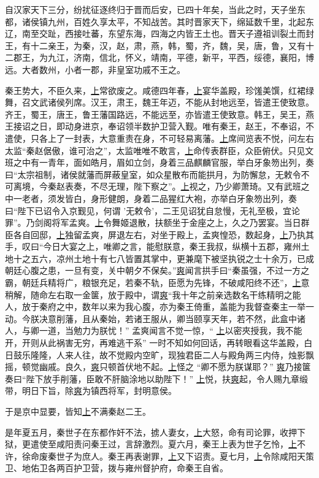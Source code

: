 \documentclass[UTF8]{ctexart}
\begin{document}
自汉家天下三分，纷扰征逐终归于晋而后安，已四十年矣，当此之时，天子坐东都，诸侯镇九州，百姓久享太平，不知战苦。其时晋家天下，绵延数千里，北起东辽，南至交趾，西接吐蕃，东望东海，四海之内皆王土也。晋天子遵祖训裂土而封王，有十二亲王，为秦，汉，赵，肃，燕，韩，蜀，齐，魏，吴，唐，鲁，又有十二郡王，为九江，济南，信北，怀义，靖南，平德，新平，平西，绥德，襄阳，博远。大者数州，小者一郡，非皇室功戚不王之。


秦王势大，不臣久来，\uline{上}常欲废之。咸德四年春，\uline{上}宴华盖殿，珍馐美馔，红裙绿舞，召文武诸侯列席。汉王，肃王，魏王年迈，不能从封地远至，皆遣王使致意。齐王，蜀王，唐王，鲁王藩国路远，不能远至，亦皆遣王使致意。韩王，吴王，燕王接诏之日，即动身进京，奉诏领半数护卫营入觐。唯有秦王，赵王，不奉诏，不遣使，只各上了一封表，大意重责在身，不可轻易离藩。\uline{上}席间览表不悦，问左右太监“秦赵倨傲，谁可治之”，太监唯唯不敢言，\uline{上}命传表群臣，众臣俯伏。只见文班之中有一青年，面如皓月，眉如立剑，身着三品麒麟官服，举白牙象笏出列，奏曰“太宗祖制，诸侯就藩而屏蔽皇室，如众星散布而能拱月，为防懈怠，无敕令不可离境，今秦赵表奏，不尽无理，陛下察之”。\uline{上}视之，乃少卿萧琦。又有武班之中一老者，须发皆白，身形健朗，身着二品猩红大袍，亦举白牙象笏出列，奏曰“陛下已诏令入京觐见，何谓 ’无敕令’，二王见诏犹自怠慢，无礼至极，宜论罪”。乃剑阁将军孟爽。\uline{上}令舞姬退散，扶额坐于金座之上，久之乃罢宴。当日群臣各自回邸，\uline{上}独留孟爽，屏退左右，对坐于殿上，孟爽惶恐，数起身，\uline{上}乃执其手，叹曰“今日大宴之上，唯卿之言，能慰朕意，秦王我叔，纵横十五郡，雍州土地十之五六，凉州土地十有七八皆置其掌中，更兼麾下被坚执锐之士十余万，已成朝廷心腹之患，一旦有变，关中朝夕不保矣。”\uline{爽}闻言拱手曰“秦虽强，不过一方之霸，朝廷兵精将广，粮银充足，若秦不轨，臣愿为先锋，不破咸阳终不还”，\uline{上}意稍解，随命左右取一金箧，放于殿中，谓\uline{爽}“我十年之前亲选数名干练精明之能人，放于秦府之中，数年以来为我心腹，亦为秦王倚重，盖能为我督查秦主一举一动。今朕决意削藩，且从秦始，若诸王服从，卿当颐享天年，若不然，此盒中诸人，与卿一道，当勉力为朕忧！” 孟爽闻言不觉一惊，“ \uline{上}以密夾授我，我不能开，开则从此祸害无穷，再难逃干系” 一时不知如何回话，再转眼看这华盖殿，白日鼓乐隆隆，人来人往，故不觉殿内空旷，现独君臣二人与殿角两三内侍，烛影飘摇，顿觉幽戚。良久，\uline{爽}只顿首伏地不起。\uline{上}怪之 “卿不愿为朕谋耶？” \uline{爽}乃接箧奏曰“陛下放手削藩，臣敢不肝脑涂地以助陛下！” \uline{上}悦，扶\uline{爽}起，令人赐九章缎带，明日下旨，除\uline{爽}为镇西将军，封明意侯。


于是京中显要，皆知\uline{上}不满秦赵二王。


是年夏五月，秦世子在东都作奸不法，掳人妻女，\uline{上}大怒，命有司论罪，收押下狱，更遣使至咸阳责问秦王过，言辞激烈。夏六月，秦王上表为世子乞怜，\uline{上}不许，徐命废秦世子为庶人。秦王再表谢罪，\uline{上}又下诏责。夏七月，\uline{上}令除咸阳天策卫、地佑卫各两百护卫营，拨与雍州督护府，命秦王自省。
\end{document}
